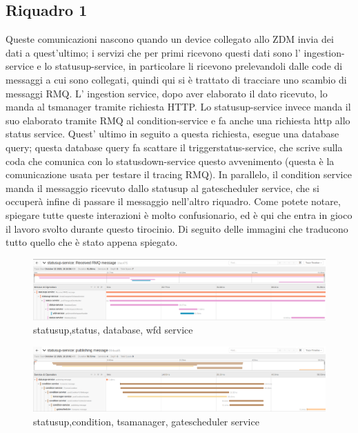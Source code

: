 \documentclass[a4paper,12pt,titlepage,italian,openany]{report}
\begin{document}
\subsection{Riquadro 1}
Queste comunicazioni nascono quando un device collegato allo ZDM\cite{zdm:1} invia dei dati a quest'ultimo; i servizi che per primi ricevono questi dati
 sono l' ingestion-service e lo statusup-service, in particolare li ricevono prelevandoli dalle code di messaggi a cui sono collegati, quindi qui si è 
 trattato di tracciare uno scambio di messaggi RMQ. L' ingestion service, dopo aver elaborato il dato ricevuto, lo manda al tsmanager tramite
richiesta HTTP. Lo statusup-service invece manda il suo elaborato tramite RMQ al condition-service e fa anche una richiesta http allo status service. 
Quest' ultimo in seguito a questa richiesta, esegue una database query; questa database query fa scattare il triggerstatus-service, che scrive sulla coda che
 comunica con lo statusdown-service questo avvenimento (questa è la comunicazione usata per testare il tracing RMQ). In parallelo, il condition service manda il messaggio ricevuto dallo statusup al gatescheduler service, che si occuperà infine di passare il messaggio nell'altro riquadro. Come potete notare, spiegare tutte queste interazioni è molto confusionario, ed è qui che entra in gioco il lavoro svolto durante questo tirocinio. Di seguito delle immagini che traducono tutto quello che è stato appena spiegato.
\begin{figure}[H]
    \includegraphics[scale=0.21]{49.png}
    \centering
    \caption{statusup,status, database, wfd service}
    
\end{figure}
\begin{figure}[H]
    \includegraphics[scale=0.21]{51.png}
    \centering
    \caption{statusup,condition, tsamanager, gatescheduler service}
    
\end{figure}
\end{document}

